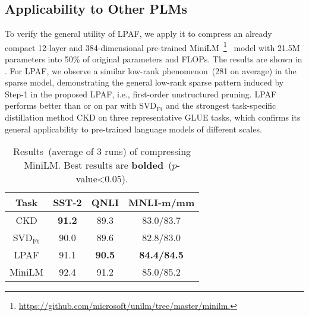 \subsection{Applicability to Other PLMs}
To verify the general utility of LPAF,  we apply it to compress an already compact 12-layer and 384-dimensional pre-trained MiniLM~\footnote{\url{https://github.com/microsoft/unilm/tree/master/minilm.}}~\cite{minilm} model with 21.5M parameters into 50\% of original parameters and FLOPs. The results are shown in . For LPAF, we observe a similar low-rank phenomenon~(281 on average) in the sparse model, demonstrating the general low-rank sparse pattern induced by Step-1 in the proposed LPAF, i.e., first-order unstructured pruning. LPAF performs better than or on par with SVD$_{\text{Ft}}$ and the strongest task-specific distillation method CKD on three representative GLUE tasks, which confirms its general applicability to pre-trained language models of different scales.
%		


\begin{table}[t]
	\centering
	\footnotesize
	\begin{tabular}{c|ccc}
		\toprule
		Task & \textbf{SST-2}   & \textbf{QNLI}     & \textbf{MNLI-m/mm}         \\
		\midrule
		CKD       & \textbf{91.2}          & 89.3          & 83.0/83.7        \\
		
		\midrule
		SVD$_{\text{Ft}}$           & 90.0          & 89.6          & 82.8/83.0        \\
		LPAF                  &91.1          & \textbf{90.5}          & \textbf{84.4/84.5}          \\
		\midrule
		MiniLM           & 92.4          & 91.2          & 85.0/85.2         \\
		\bottomrule
	\end{tabular}
	\caption{Results~(average of 3 runs) of  compressing MiniLM. Best results are \textbf{bolded}~($p$-value<0.05).}
	\label{table:roberta}
\end{table}


